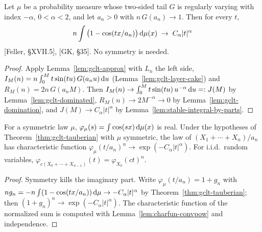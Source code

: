 \begin{theorem}
  \label{thm:gclt-tauberian}
  \leanok
  Let $\mu$ be a probability measure whose two-sided tail $G$ is regularly varying with index
  $-\alpha$, $0 < \alpha < 2$, and let $a_n > 0$ with $n \, G(a_n) \to 1$. Then for every $t$,
  \begin{align*}
    n \int \big( 1 - \cos(t x / a_n) \big) \, \mathrm{d} \mu(x) \; \to \; C_\alpha |t|^\alpha
  \end{align*}
  [Feller, \S XVII.5], [GK, \S35]. No symmetry is needed.
\end{theorem}
\begin{proof}
  \leanok
  Apply Lemma~\ref{lem:gclt-approx} with $L_n$ the left side, $I_M(n) = n \int_0^M t \sin(tu) \,
  G(a_n u) \, \mathrm{d} u$ (Lemma~\ref{lem:gclt-layer-cake}) and $R_M(n) = 2 n \, G(a_n M)$. Then
  $I_M(n) \to \int_0^M t \sin(tu) \, u^{-\alpha} \, \mathrm{d} u =: J(M)$ by
  Lemma~\ref{lem:gclt-dominated}, $R_M(n) \to 2 M^{-\alpha} \to 0$ by
  Lemma~\ref{lem:gclt-domination}, and $J(M) \to C_\alpha |t|^\alpha$ by
  Lemma~\ref{lem:stable-integral-by-parts}.
\end{proof}

\begin{lemma}
  \label{lem:gclt-charfun}
  \leanok
  For a symmetric law $\mu$, $\varphi_\mu(s) = \int \cos(sx) \, \mathrm{d} \mu(x)$ is real. Under the
  hypotheses of Theorem~\ref{thm:gclt-tauberian} with $\mu$ symmetric, the law of
  $(X_1 + \cdots + X_n)/a_n$ has characteristic function
  $\varphi_\mu(t/a_n)^n \to \exp(-C_\alpha |t|^\alpha)$. For i.i.d.\ random variables,
  $\varphi_{c(X_0 + \cdots + X_{n-1})}(t) = \varphi_{X_0}(ct)^n$.
\end{lemma}
\begin{proof}
  \leanok
  Symmetry kills the imaginary part. Write $\varphi_\mu(t/a_n) = 1 + g_n$ with
  $n g_n = -n \int (1 - \cos(tx/a_n)) \, \mathrm{d} \mu \to -C_\alpha|t|^\alpha$ by
  Theorem~\ref{thm:gclt-tauberian}; then $(1 + g_n)^n \to \exp(-C_\alpha|t|^\alpha)$. The
  characteristic function of the normalized sum is computed with Lemma~\ref{lem:charfun-convpow}
  and independence.
\end{proof}

